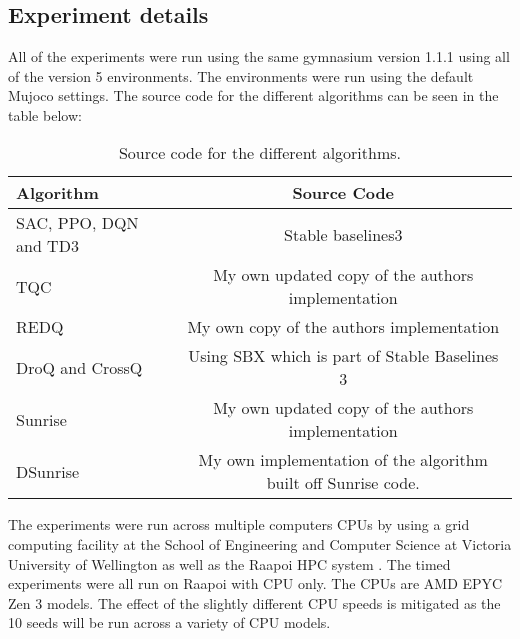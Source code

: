 \chapter{}\label{C:appendixA}

\section{Experiment details}

All of the experiments were run using the same gymnasium version 1.1.1 using all of the version 5 environments. The environments were run using the default Mujoco settings. The source code for the different algorithms can be seen in the table below:

\begin{table}[H]
\centering
\caption{Source code for the different algorithms.}
\label{tab:sourcecode}
\begin{tabular}{l|c}
\toprule
\textbf{Algorithm}                & \textbf{Source Code}             \\
\midrule\midrule
SAC, PPO, DQN and TD3 & Stable baselines3 \cite{stable-baselines3} \\

TQC & My own updated copy of the authors implementation \cite{thompson1jamesthompson1Tqc_pytorch2025} \cite{SamsungLabsTqc_pytorchImplementation} \\
REDQ & My own copy of the authors implementation \cite{thompson1jamesthompson1REDQ2025} \cite{watchernyuWatchernyuREDQ2025} \\
DroQ and CrossQ & Using SBX which is part of Stable Baselines 3 \cite{stable-baselines3} \\
Sunrise & My own updated copy of the authors implementation \cite{thompson1jamesthompson1Sunrise2025} \cite{leePokaxpokaSunrise2025} \\
DSunrise & My own implementation of the algorithm built off Sunrise code. \cite{thompson1jamesthompson1Sunrise2025} \\
\bottomrule
\end{tabular}
\end{table}

The experiments were run across multiple computers CPUs by using a grid computing facility at the School of Engineering and Computer Science at Victoria University of Wellington as well as the Raapoi HPC system \cite{RapoiClusterDocumentation}. The timed experiments were all run on Raapoi with CPU only. The CPUs are AMD EPYC Zen 3 models. The effect of the slightly different CPU speeds is mitigated as the 10 seeds will be run across a variety of CPU models.

